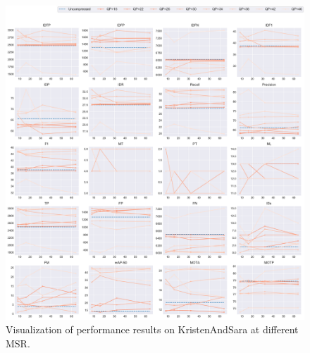 \begin{figure}[!htbp]
\centering
\includegraphics[width=1.0\linewidth]{img/appendix/KristenAndSara_all_multiplots_msr.pdf}
\caption[Visualization of performance results on KristenAndSara at different MSR]
{Visualization of performance results on KristenAndSara at different MSR.}
\label{fig:KristenAndSara_all_msr}
\end{figure}



